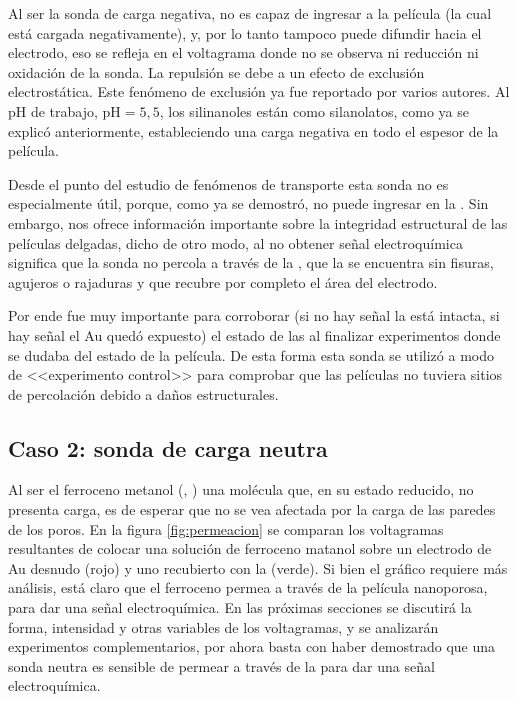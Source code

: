 	 Al ser la sonda de carga negativa, no es capaz de ingresar a la película (la cual está cargada negativamente), y, por lo tanto tampoco puede difundir hacia el electrodo, eso se refleja en el voltagrama donde no se observa ni reducción ni oxidación de la sonda. La repulsión se debe a un efecto de exclusión electrostática. Este fenómeno de exclusión ya fue reportado por varios autores\cite{alberti2015,schmuhl2005,Andrieu-Brunsen2015,brunsen2011}. Al pH de trabajo, $\text{pH}=5,5$, los silinanoles están como silanolatos, como ya se explicó anteriormente, estableciendo una carga negativa en todo el espesor de la película.

	 Desde el punto del estudio de fenómenos de  transporte esta sonda no es especialmente útil, porque, como ya se demostró, no puede ingresar en la \pdm. Sin embargo, nos ofrece información importante sobre la integridad estructural de las películas delgadas, dicho de otro modo, al no obtener señal electroquímica significa que la sonda no percola a través de la \pdm, que la \pdm\space se encuentra sin fisuras, agujeros o rajaduras y que recubre por completo el área del electrodo.

	 Por ende fue muy importante para corroborar (si no hay señal la \pdm está intacta, si hay señal el Au quedó expuesto) el estado de las \pdm\space al finalizar experimentos donde se dudaba del estado de la película.  De esta forma esta sonda se utilizó a modo de <<experimento control>> para comprobar que las películas no tuviera sitios de percolación debido a daños estructurales.

	\subsection{Caso 2: sonda de carga neutra}

		Al ser el ferroceno metanol (\ferroceno, \fc) una molécula que, en su estado reducido, no presenta carga, es de esperar que no se vea afectada por la carga de las paredes de los poros. En la figura \ref{fig:permeacion} se comparan los voltagramas resultantes de colocar una solución de ferroceno matanol sobre un electrodo de Au desnudo (rojo) y uno recubierto con la \pdm\space (verde).  Si bien el gráfico  requiere más análisis, está claro que el ferroceno permea a través de la película nanoporosa, para dar una señal electroquímica. En las próximas secciones se discutirá la forma, intensidad y otras variables de los voltagramas, y se analizarán experimentos complementarios, por ahora basta con haber demostrado que una sonda neutra es sensible de permear a través de la \pdm\space para dar una señal electroquímica.

